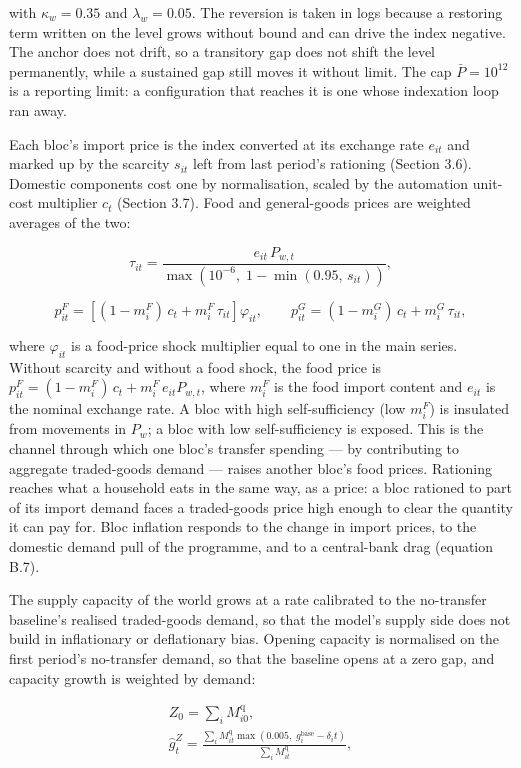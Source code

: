 \documentclass[preprint,review,12pt]{elsarticle}
\begin{document}
with \(\kappa_w = 0.35\) and \(\lambda_w = 0.05\). The reversion is
taken in logs because a restoring term written on the level grows
without bound and can drive the index negative. The anchor does not
drift, so a transitory gap does not shift the level permanently, while a
sustained gap still moves it without limit. The cap
\(\bar{P} = 10^{12}\) is a reporting limit: a configuration that reaches
it is one whose indexation loop ran away.

Each bloc's import price is the index converted at its exchange rate
\(e_{it}\) and marked up by the scarcity \(s_{it}\) left from last
period's rationing (Section 3.6). Domestic components cost one by
normalisation, scaled by the automation unit-cost multiplier \(c_t\)
(Section 3.7). Food and general-goods prices are weighted averages of
the two:

\[\tau_{it} = \frac{e_{it} \, P_{w,t}}{\max\left( 10^{-6},\; 1 - \min(0.95,\, s_{it}) \right)}, \tag{26}\]

\[p^F_{it} = \left[ (1 - m^F_i) \, c_t + m^F_i \, \tau_{it} \right] \varphi_{it}, \qquad p^G_{it} = (1 - m^G_i) \, c_t + m^G_i \, \tau_{it}, \tag{27}\]

where \(\varphi_{it}\) is a food-price shock multiplier equal to one in
the main series. Without scarcity and without a food shock, the food
price is \(p^F_{it} = (1 - m^F_i)\,c_t + m^F_i \, e_{it} P_{w,t}\),
where \(m^F_i\) is the food import content and \(e_{it}\) is the nominal
exchange rate. A bloc with high self-sufficiency (low \(m^F_i\)) is
insulated from movements in \(P_w\); a bloc with low self-sufficiency is
exposed. This is the channel through which one bloc's transfer spending
--- by contributing to aggregate traded-goods demand --- raises another
bloc's food prices. Rationing reaches what a household eats in the same
way, as a price: a bloc rationed to part of its import demand faces a
traded-goods price high enough to clear the quantity it can pay for.
Bloc inflation responds to the change in import prices, to the domestic
demand pull of the programme, and to a central-bank drag (equation B.7).

The supply capacity of the world grows at a rate calibrated to the
no-transfer baseline's realised traded-goods demand, so that the model's
supply side does not build in inflationary or deflationary bias. Opening
capacity is normalised on the first period's no-transfer demand, so that
the baseline opens at a zero gap, and capacity growth is weighted by
demand:

\[\begin{gathered} Z_0 = \sum_i M^{\mathrm{q}}_{i0}, \\ \hat{g}^Z_t = \frac{\sum_i M^{\mathrm{q}}_{it} \max\left( 0.005,\; g^{\mathrm{base}}_i - \delta_i t \right)}{\sum_i M^{\mathrm{q}}_{it}}, \end{gathered} \tag{28}\]
\end{document}
